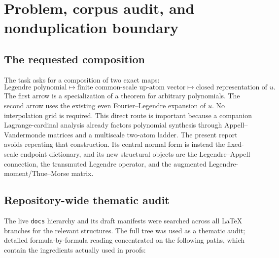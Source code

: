 \documentclass[11pt,oneside]{article}
\theoremstyle{definition}
\theoremstyle{remark}
\begin{document}
\begin{abstract}
Finally, adjoining the finite Thue--Morse polynomiality certificate to the
matrix of Legendre moments of the endpoint atoms gives an invertible
$(d+2)\times(d+2)$ matrix.  Its inverse simultaneously contains every
Legendre-to-up coefficient vector and a canonically normalized nonpolynomial
defect.  This identifies the endpoint synthesis as a biorthogonal completion
of Legendre moments by one Thue--Morse row.  Exact computations verify all
matrix inversions, recurrences, rank statements, and certificates through
degree $24$ for the Appell connection and through degree $12$ for the
one-scale atom formulas.  New conjectures concern strict sign alternation,
quadratic logarithmic coefficient growth, total positivity, a
$q$-hypergeometric compression, and Lambert--$W$ edge asymptotics.
\end{abstract}

\tableofcontents
\newpage

\section{Problem, corpus audit, and nonduplication boundary}

\subsection{The requested composition}
The task asks for a composition of two exact maps:
\[
 \text{Legendre polynomial}
 \longmapsto
 \text{finite common-scale up-atom vector}
 \longmapsto
 \text{closed representation of }u.
\]
The first arrow is a specialization of a theorem for arbitrary polynomials.
The second arrow uses the existing even Fourier--Legendre expansion of $u$.
No interpolation grid is required.  This direct route is important because a
companion Lagrange-cardinal analysis already factors polynomial synthesis
through Appell--Vandermonde matrices and a multiscale two-atom ladder.  The
present report avoids repeating that construction.  Its central normal form
is instead the fixed-scale endpoint dictionary, and its new structural
objects are the Legendre--Appell connection, the transmuted Legendre operator,
and the augmented Legendre-moment/Thue--Morse matrix.

\subsection{Repository-wide thematic audit}
The live \texttt{docs} hierarchy and its draft manifests were searched across
all LaTeX branches for the relevant structures.  The full tree was used as a
thematic audit; detailed formula-by-formula reading concentrated on the
following paths, which contain the ingredients actually used in proofs:
\end{document}
